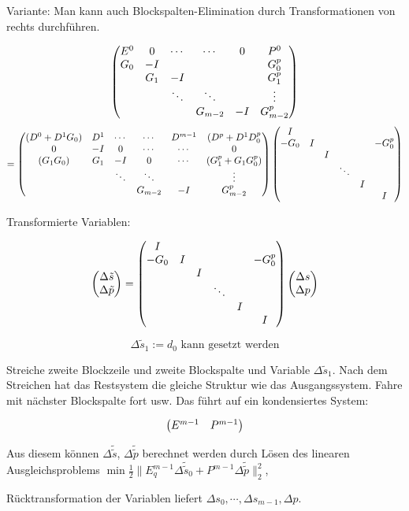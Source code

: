 Variante: Man kann auch Blockspalten-Elimination durch Transformationen von rechts durchführen.


\[ \begin{pmatrix} E^0 & 0 & \cdots & \cdots & 0 & P^0 \\ G_0 & -I & && & G_0^p \\ & G_1 & -I & && G_1^p \\ & & \ddots & \ddots & & \vdots \\ & & & G_{m-2} & -I & G_{m-2}^p \end{pmatrix} \] \[ = \begin{pmatrix} (D^0 + D^1 G_0) & D^1 & \cdots & \cdots & D^{m-1} & (D^p + D^1 D_0^p \\ 0 & -I & 0 & \cdots & \cdots & 0 \\ (G_1 G_0) & G_1 & -I & 0 & \cdots & (G_1^p + G_1 G_0^p) \\ & & \ddots & \ddots && \vdots\\ &&& G_{m-2} & -I & G_{m-2}^p \end{pmatrix} \begin{pmatrix} I \\ -G_0 & I &&&& -G_0^p \\ && I \\ &&& \ddots \\ &&&& I \\ &&&&& I \end{pmatrix} \]

Transformierte Variablen:

\[ \begin{pmatrix} \Delta \tilde s \\ \Delta \tilde p \end{pmatrix} =  \begin{pmatrix} I \\ -G_0 & I &&&& -G_0^p \\ && I \\ &&& \ddots \\ &&&& I \\ &&&&& I \end{pmatrix} \begin{pmatrix} \Delta s \\ \Delta p \end{pmatrix} \]

\[ \Delta \tilde s_1 := d_0 \text{ kann gesetzt werden}\]

Streiche zweite Blockzeile und zweite Blockspalte und Variable $\Delta \tilde s_1$. Nach dem Streichen hat das Restsystem die gleiche Struktur wie das Ausgangssystem. Fahre mit nächster Blockspalte fort usw. Das führt auf ein kondensiertes System:

\[ \begin{pmatrix} E^{m-1} & P^{m-1} \end{pmatrix} \]

Aus diesem können $\Delta \tilde \tilde s$, $\Delta \tilde \tilde p$ berechnet werden durch Lösen des linearen Ausgleichsproblems $\min \frac 12 \| E_q^{m-1} \Delta \tilde \tilde s_0 + P^{m-1} \Delta \tilde \tilde p\|_2^2$, $ $

Rücktransformation der Variablen liefert $\Delta s_0, \cdots, \Delta s_{m-1}, \Delta p$.

